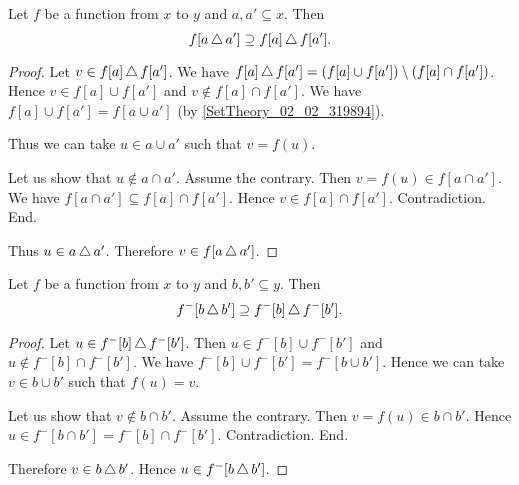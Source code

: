 \documentclass[../../set-theory.tex]{subfiles}
\begin{document}
  \begin{forthel}
    \begin{proposition}\label{SetTheory_02_04_657921}
      Let $f$ be a function from $x$ to $y$ and $a,a' \subseteq x$.
      Then \[ f[a \mathop{\triangle} a'] \supseteq f[a] \mathop{\triangle} f[a']. \]
    \end{proposition}
    \begin{proof}
      Let $v \in f[a] \mathop{\triangle} f[a']$.
      We have $f[a] \mathop{\triangle} f[a'] = (f[a] \cup f[a']) \setminus (f[a] \cap f[a'])$.
      Hence $v \in f[a] \cup f[a']$ and $v \notin f[a] \cap f[a']$.
      We have $f[a] \cup f[a'] = f[a \cup a']$ (by \ref{SetTheory_02_02_319894}).

      Thus we can take $u \in a \cup a'$ such that $v = f(u)$.

      Let us show that $u \notin a \cap a'$.
        Assume the contrary.
        Then $v = f(u) \in f[a \cap a']$.
        We have $f[a \cap a'] \subseteq f[a] \cap f[a']$.
        Hence $v \in f[a] \cap f[a']$.
        Contradiction.
      End.

      Thus $u \in a \mathop{\triangle} a'$.
      Therefore $v \in f[a \mathop{\triangle} a']$.
    \end{proof}


    \begin{proposition}\label{SetTheory_02_04_661750}
      Let $f$ be a function from $x$ to $y$ and $b,b' \subseteq y$.
      Then \[ f^{-}[b \mathop{\triangle} b'] \supseteq f^{-}[b] \mathop{\triangle} f^{-}[b']. \]
    \end{proposition}
    \begin{proof}
      Let $u \in f^{-}[b] \mathop{\triangle} f^{-}[b']$.
      Then $u \in f^{-}[b] \cup f^{-}[b']$ and $u \notin f^{-}[b] \cap f^{-}[b']$.
      We have $f^{-}[b] \cup f^{-}[b'] = f^{-}[b \cup b']$.
      Hence we can take $v \in b \cup b'$ such that $f(u) = v$.

      Let us show that $v \notin b \cap b'$.
        Assume the contrary.
        Then $v = f(u) \in b \cap b'$.
        Hence $u \in f^{-}[b \cap b'] = f^{-}[b] \cap f^{-}[b']$.
        Contradiction.
      End.

      Therefore $v \in b \mathop{\triangle} b'$.
      Hence $u \in f^{-}[b \mathop{\triangle} b']$.
    \end{proof}
  \end{forthel}
\end{document}
